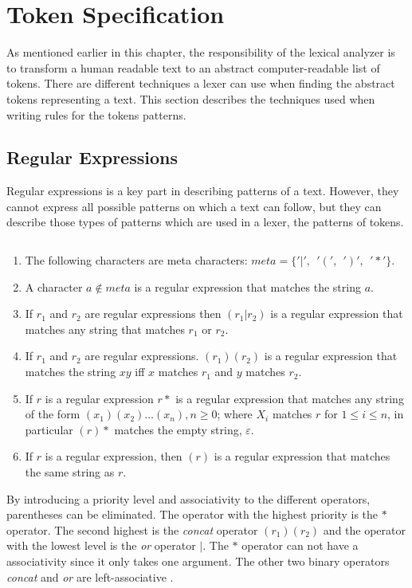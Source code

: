 \section{Token Specification}
As mentioned earlier in this chapter, the responsibility of the lexical analyzer
is to transform a human readable text to an abstract computer-readable list of
tokens. There are different techniques a lexer can use when finding the
abstract tokens representing a text. This section describes the techniques used
when writing rules for the tokens patterns.

\subsection{Regular Expressions}
Regular expressions is a key part in describing patterns of a text. However,
they cannot express all possible patterns on which a text can follow, but they
can describe those types of patterns which are used in a lexer, the patterns of
tokens.

\begin{definition}\label{regexp} $ $\\
\begin{enumerate}
  \item The following characters are meta characters: $meta = \{ '|', ~~ '(', ~~ ')', ~~ '*' \}$.
  \item A character $a \notin meta$ is a regular expression that matches the 
      string $a$.
  \item If $r_1$ and $r_2$ are regular expressions then $(r_1 | r_2)$ is a 
      regular expression that matches any string that matches $r_1$ or $r_2$.
  \item If $r_1$ and $r_2$ are regular expressions. $(r_1)(r_2)$ is a regular
      expression that matches the string $xy$ iff $x$ matches $r_1$
      and $y$ matches $r_2$.
  \item If $r$ is a regular expression $r*$ is a regular expression that
      matches any string of the form $(x_1)(x_2) \dots  (x_n), n \geq 0$;
      where $X_i$ matches $r$ for $1 \leq i \leq n$, in particular $(r)*$ 
      matches the empty string, $\varepsilon$.
  \item If $r$ is a regular expression, then $(r)$ is a regular expression that
      matches the same string as $r$.
\end{enumerate}
\qeda
\end{definition}

By introducing a priority level and associativity to the different operators,
parentheses can be eliminated. The operator with the highest priority is the $*$
operator. The second highest is the \emph{concat} operator $(r_1)(r_2)$ and the
operator with the lowest level is the \emph{or} operator $|$. The $*$ operator
can not have a associativity since it only takes one argument. The other two
binary operators \emph{concat} and \emph{or} are left-associative
\cite{Aho1990}.

